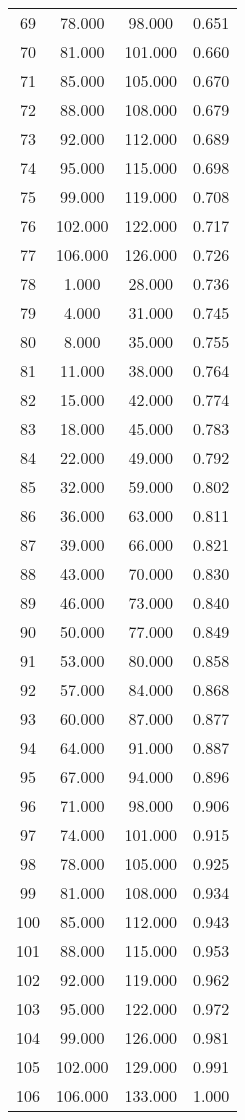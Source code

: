\begin{tabular}{cccc}
  69 & 78.000 & 98.000 & 0.651 \\ 
  70 & 81.000 & 101.000 & 0.660 \\ 
  71 & 85.000 & 105.000 & 0.670 \\ 
  72 & 88.000 & 108.000 & 0.679 \\ 
  73 & 92.000 & 112.000 & 0.689 \\ 
  74 & 95.000 & 115.000 & 0.698 \\ 
  75 & 99.000 & 119.000 & 0.708 \\ 
  76 & 102.000 & 122.000 & 0.717 \\ 
  77 & 106.000 & 126.000 & 0.726 \\ 
  78 & 1.000 & 28.000 & 0.736 \\ 
  79 & 4.000 & 31.000 & 0.745 \\ 
  80 & 8.000 & 35.000 & 0.755 \\ 
  81 & 11.000 & 38.000 & 0.764 \\ 
  82 & 15.000 & 42.000 & 0.774 \\ 
  83 & 18.000 & 45.000 & 0.783 \\ 
  84 & 22.000 & 49.000 & 0.792 \\ 
  85 & 32.000 & 59.000 & 0.802 \\ 
  86 & 36.000 & 63.000 & 0.811 \\ 
  87 & 39.000 & 66.000 & 0.821 \\ 
  88 & 43.000 & 70.000 & 0.830 \\ 
  89 & 46.000 & 73.000 & 0.840 \\ 
  90 & 50.000 & 77.000 & 0.849 \\ 
  91 & 53.000 & 80.000 & 0.858 \\ 
  92 & 57.000 & 84.000 & 0.868 \\ 
  93 & 60.000 & 87.000 & 0.877 \\ 
  94 & 64.000 & 91.000 & 0.887 \\ 
  95 & 67.000 & 94.000 & 0.896 \\ 
  96 & 71.000 & 98.000 & 0.906 \\ 
  97 & 74.000 & 101.000 & 0.915 \\ 
  98 & 78.000 & 105.000 & 0.925 \\ 
  99 & 81.000 & 108.000 & 0.934 \\ 
  100 & 85.000 & 112.000 & 0.943 \\ 
  101 & 88.000 & 115.000 & 0.953 \\ 
  102 & 92.000 & 119.000 & 0.962 \\ 
  103 & 95.000 & 122.000 & 0.972 \\ 
  104 & 99.000 & 126.000 & 0.981 \\ 
  105 & 102.000 & 129.000 & 0.991 \\ 
  106 & 106.000 & 133.000 & 1.000 \\ 
   \hline
\end{tabular}
